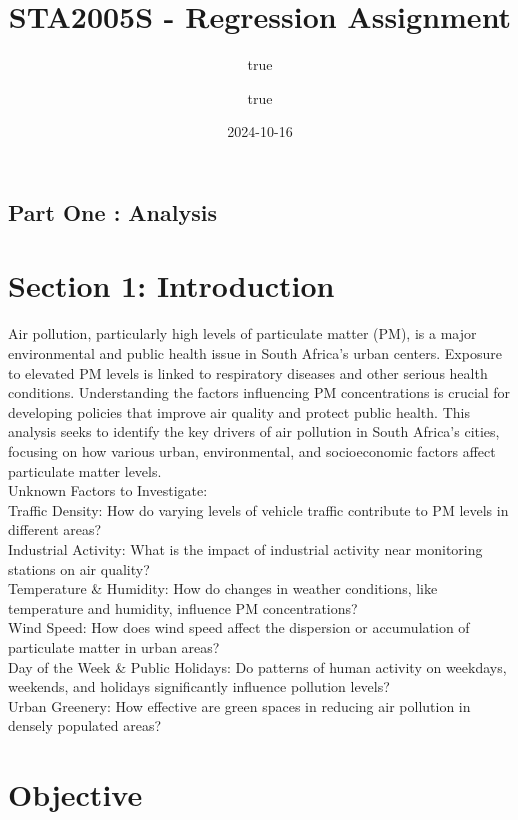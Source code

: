 \documentclass[
]{article}
\title{STA2005S - Regression Assignment}
\author{true \and true}
\date{2024-10-16}
\begin{document}
\maketitle

\newpage

\hypertarget{part-one-analysis}{%
\subsection{Part One : Analysis}\label{part-one-analysis}}

\hypertarget{section-1-introduction}{%
\section{Section 1: Introduction}\label{section-1-introduction}}

Air pollution, particularly high levels of particulate matter (PM), is a
major environmental and public health issue in South Africa's urban
centers. Exposure to elevated PM levels is linked to respiratory
diseases and other serious health conditions. Understanding the factors
influencing PM concentrations is crucial for developing policies that
improve air quality and protect public health. This analysis seeks to
identify the key drivers of air pollution in South Africa's cities,
focusing on how various urban, environmental, and socioeconomic factors
affect particulate matter levels.\\
Unknown Factors to Investigate:\\
Traffic Density: How do varying levels of vehicle traffic contribute to
PM levels in different areas?\\
Industrial Activity: What is the impact of industrial activity near
monitoring stations on air quality?\\
Temperature \& Humidity: How do changes in weather conditions, like
temperature and humidity, influence PM concentrations?\\
Wind Speed: How does wind speed affect the dispersion or accumulation of
particulate matter in urban areas?\\
Day of the Week \& Public Holidays: Do patterns of human activity on
weekdays, weekends, and holidays significantly influence pollution
levels?\\
Urban Greenery: How effective are green spaces in reducing air pollution
in densely populated areas?

\hypertarget{objective}{%
\section{Objective}\label{objective}}
\end{document}
